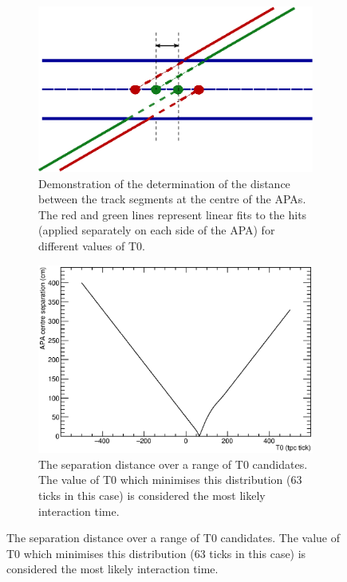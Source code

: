 \begin{figure}
  \vspace*{\floatsep}

  \begin{subfigure}[t]{0.48\linewidth}
    \centering
    \includegraphics[width=\textwidth]{track_separation.eps}
    \caption{Demonstration of the determination of the distance between the track segments at the centre of the APAs.  The red and green lines represent linear fits to the hits (applied separately on each side of the APA) for different values of T0.}
    \label{fig:APACrossingAligmentLeastSqSeparation}
  \end{subfigure}
  \hfill
  \begin{subfigure}[t]{0.48\linewidth}
    \centering
    \includegraphics[width=\textwidth]{separation.eps}
    \caption{The separation distance over a range of T0 candidates.  The value of T0 which minimises this distribution (63 ticks in this case) is considered the most likely interaction time.}
    \label{fig:APACrossingAlignmentSeparationMin}

\end{subfigure}
\end{figure}
